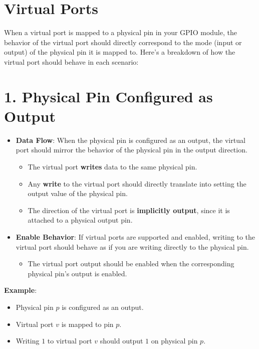 
\section{Virtual Ports}

When a virtual port is mapped to a physical pin in your GPIO module, the behavior of the virtual port should directly correspond to the mode (input or output) of the physical pin it is mapped to. Here's a breakdown of how the virtual port should behave in each scenario:

\section*{1. Physical Pin Configured as Output}
\begin{itemize}
    \item \textbf{Data Flow}: When the physical pin is configured as an output, the virtual port should mirror the behavior of the physical pin in the output direction.
    \begin{itemize}
        \item The virtual port \textbf{writes} data to the same physical pin.
        \item Any \textbf{write} to the virtual port should directly translate into setting the output value of the physical pin.
        \item The direction of the virtual port is \textbf{implicitly output}, since it is attached to a physical output pin.
    \end{itemize}
    \item \textbf{Enable Behavior}: If virtual ports are supported and enabled, writing to the virtual port should behave as if you are writing directly to the physical pin.
    \begin{itemize}
        \item The virtual port output should be enabled when the corresponding physical pin’s output is enabled.
    \end{itemize}
\end{itemize}

\textbf{Example}:
\begin{itemize}
    \item Physical pin $p$ is configured as an output.
    \item Virtual port $v$ is mapped to pin $p$.
    \item Writing $1$ to virtual port $v$ should output $1$ on physical pin $p$.
\end{itemize}

